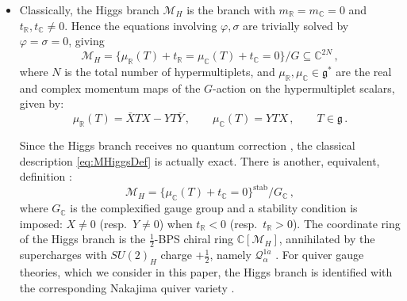 \documentclass[12pt,a4paper]{article}
\renewcommand{\(}{\left(}
\renewcommand{\)}{\right)}
\renewcommand{\(}{\left(}
\renewcommand{\)}{\right)}
\begin{document}
\begin{itemize}
\item Classically, the Higgs branch $\mathcal{M}_H$ is the branch with $m_{\mathbb{R}}=m_{\mathbb{C}}=0$ and $t_{\mathbb{R}},t_{\mathbb{C}}\neq 0$. Hence the equations involving $\varphi,\sigma$ are trivially solved by $\varphi=\sigma=0$, giving
\begin{equation}\label{eq:MHiggsDef}
\mathcal{M}_H=\{\mu_{\mathbb{R}}(T)+t_{\mathbb{R}}=\mu_{\mathbb{C}}(T)+t_{\mathbb{C}}=0\}/ G\subseteq \mathbb{C}^{2N}\,,
\end{equation}
where $N$ is the total number of hypermultiplets, and $\mu_{\mathbb{R}},\mu_{\mathbb{C}}\in \mathfrak{g}^*$ are the real and complex momentum maps of the $G$-action on the hypermultiplet scalars, given by:
\begin{equation}
\mu_{\mathbb{R}}(T)=\bar{X}TX-YT\bar{Y}\,,\qquad \mu_{\mathbb{C}}(T)= YT X\,,\qquad T\in \mathfrak{g}\,.
\end{equation}

Since the Higgs branch receives no quantum correction \cite{Seiberg:1994aj,Argyres:1996eh}, the classical description \eqref{eq:MHiggsDef} is actually exact.
There is another, equivalent, definition \cite{Bullimore:2016hdc}:
\begin{equation}
\mathcal{M}_H=\{\mu_{\mathbb{C}}(T)+t_{\mathbb{C}}=0\}^{\textrm{stab}}/ G_{\mathbb{C}}\,,
\end{equation}
where $G_{\mathbb{C}}$ is the complexified gauge group and a stability condition is imposed: $X\neq 0$ (resp.\ $Y\neq 0$) when $t_{\mathbb{R}} < 0$ (resp.\ $t_{\mathbb{R}}> 0$). 
The coordinate ring of the Higgs branch is the $\frac{1}{2}$-BPS chiral ring $\mathbb{C}[\mathcal{M}_H]$, annihilated by the supercharges with $SU(2)_H$ charge $+\frac{1}{2}$, namely $\mathcal{Q}^{1\dot{a}}_{\alpha}$
\cite{Bullimore:2018gva}. 
For quiver gauge theories, which we consider in this paper, the Higgs branch is identified with the corresponding Nakajima quiver variety \cite{Nakajima:1994nid}.


\end{itemize}
\end{document}
